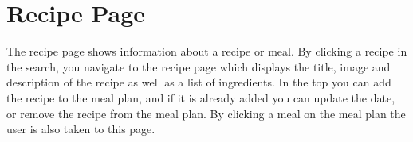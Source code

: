 \section{Recipe Page}
The recipe page shows information about a recipe or meal. By clicking a recipe in the search, you navigate to the recipe page which displays the title, image and description of the recipe as well as a list of ingredients. In the top you can add the recipe to the meal plan, and if it is already added you can update the date, or remove the recipe from the meal plan.
By clicking a meal on the meal plan the user is also taken to this page.

